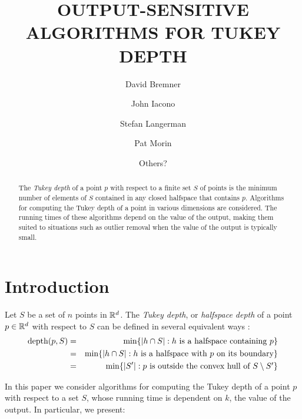 \documentclass[charterfonts,lotsofwhite]{patmorin}
\title{\MakeUppercase{Output-Sensitive Algorithms for Tukey Depth}}
\author{David Bremner \and
	John Iacono \and
	Stefan Langerman \and
	Pat Morin \and
	Others?}
\date{}
\newcommand{\td}{\mathrm{depth}}
\begin{document}
\maketitle

\begin{abstract}
The \emph{Tukey depth} of a point $p$ with respect to a finite set $S$ of
points is the minimum number of elements of $S$ contained in any
closed halfspace that contains $p$.  Algorithms for computing the
Tukey depth of a point in various dimensions are considered.  The
running times of these algorithms depend on the value of the output,
making them suited to situations such as outlier removal when the
value of the output is typically small.
\end{abstract}

\section{Introduction}

Let $S$ be a set of $n$ points in $\mathbb{R}^d$.
The \emph{Tukey depth}, or \emph{halfspace depth} of a point $p\in\mathbb{R}^d$ with
respect to $S$ can be defined in several equivalent ways \cite{t73}:
\begin{eqnarray}
\td(p,S) & = & \min\{ |h\cap S| :
	             \mbox{$h$ is a halfspace containing $p$} \} \\ 
                     \eqlabel{tuk-orig}
            & = & \min\{ |h\cap S| :
                      \mbox{$h$ is a halfspace with $p$ on its boundary} \} \\ 
                       \eqlabel{tuk-boundary}
            & = & \min\{ |S'| :
                      \mbox{$p$ is outside the convex hull of 
                           $S\setminus S'$} \}
                      \eqlabel{tuk-hull}
\end{eqnarray}

In this paper we consider algorithms for computing the Tukey depth of
a point $p$ with respect to a set $S$, whose running time is dependent
on $k$, the value of the output. In particular, we present:
\end{document}
